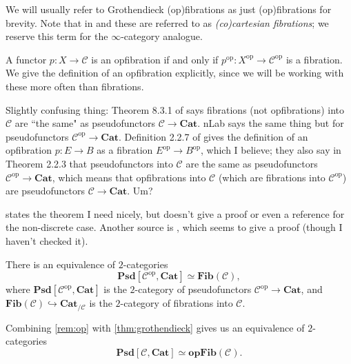 \documentclass{MetricNotes2023}
\begin{document}
We will usually refer to Grothendieck (op)fibrations as just (op)fibrations for brevity. Note that in \autocite{symmetricmonoidal} and \autocite{lurie2008higher} these are referred to as \textit{(co)cartesian fibrations}; we reserve this term for the \(\infty\)-category analogue. 

\begin{remark}\label{rem:op}
A functor \(p : X \to \mathcal{C}\) is an opfibration if and only if \(p^{\text{op}} : X^{\text{op}}\to \mathcal{C}^{\text{op}}\) is a fibration. We give the definition of an opfibration explicitly, since we will be working with these more often than fibrations.  
\end{remark}

Slightly confusing thing: Theorem 8.3.1 of \autocite{categorical} says fibrations (not opfibrations) into \(\mathcal{C}\) are ``the same" as pseudofunctors \(\mathcal{C} \to \textbf{Cat}\). nLab says the same thing but for pseudofunctors \(\mathcal{C}^{\text{op}}\to \textbf{Cat}\). Definition 2.2.7 of \autocite{fibrational_notions} gives the definition of an opfibration \(p : E \to B\) as a fibration \(E^{\text{op}}\to B^{\text{op}}\), which I believe; they also say in Theorem 2.2.3 that pseudofunctors into \(\mathcal{C}\) are the same as pseudofunctors \(\mathcal{C}^{\text{op}}\to \textbf{Cat}\), which means that opfibrations into \(\mathcal{C}\) (which are fibrations into \(\mathcal{C}^{\text{op}}\)) are pseudofunctors \(\mathcal{C} \to \textbf{Cat}\). Um? 

\autocite{categorical} states the theorem I need nicely, but doesn't give a proof or even a reference for the non-discrete case. Another source is \autocite{monoidalgrothendieck}, which seems to give a proof (though I haven't checked it). 

\begin{theorem}\label{thm:grothendieck}
There is an equivalence of \(2\)-categories 
\[\textbf{Psd}[\mathcal{C}^{\text{op}}, \textbf{Cat}]\simeq \textbf{Fib}(\mathcal{C}),\]
where \(\textbf{Psd}[\mathcal{C}^{\text{op}}, \textbf{Cat}]\) is the \(2\)-category of pseudofunctors \(\mathcal{C}^{\text{op}}\to \textbf{Cat}\), and \(\textbf{Fib}(\mathcal{C})\hookrightarrow \textbf{Cat}_{/\mathcal{C}}\) is the \(2\)-category of fibrations into \(\mathcal{C}\). 
\end{theorem}

\begin{remark}
Combining \ref{rem:op} with \ref{thm:grothendieck} gives us an equivalence of \(2\)-categories
\[\textbf{Psd}[\mathcal{C}, \textbf{Cat}]\simeq \textbf{opFib}(\mathcal{C}).\]
\end{remark}
\end{document}

